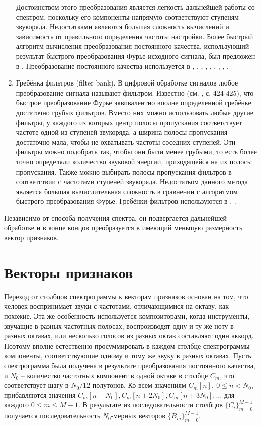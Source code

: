 \begin{enumerate}
  Достоинством этого преобразования является легкость дальнейшей работы со
  спектром, поскольку его компоненты напрямую соответствуют ступеням звукоряда.
  Недостатками являются большая сложность вычислений и зависимость от
  правильного определения частоты настройки. Более быстрый алгоритм вычисления
  преобразования постоянного качества, использующий результат быстрого
  преобразования Фурье исходного сигнала, был предложен в \cite{Brown1992}.
  Преобразование постоянного качества используется в \cite{Bello2005},
  \cite{Lee2006}, \cite{Mauch2008}, \cite{Mauch2009}, \cite{Oudre2009},
  \cite{Reed2009}, \cite{Cho2010}, \cite{Cho2011}, \cite{Ni2011}.
  
  \item Гребёнка фильтров (filter bank). В цифровой обработке сигналов любое
  преобразование сигнала называют фильтром. Известно (см. \cite{Rabiner1978}, с.
  424-425), что быстрое преобразование Фурье эквивалентно вполне определенной
  гребёнке достаточно грубых фильтров. Вместо них можно использовать любые
  другие фильтры, у каждого из которых центр полосы пропускания соответствует
  частоте одной из ступеней звукоряда, а ширина полосы пропускания достаточно
  мала, чтобы не охватывать частоты соседних ступеней. Эти фильтры можно
  подобрать так, чтобы они были менее грубыми, то есть более точно определяли
  количество звуковой энергии, приходящейся на их полосы пропускания. Также
  можно выбирать полосы пропускания фильтров в соответствии с частотами ступеней
  звукоряда. Недостатком данного метода является большая вычислительная
  сложность в сравнении с алгоритмом быстрого преобразования Фурье. Гребёнки
  фильтров используются в \cite{Jiang2011}, \cite{Humphrey2012}.
\end{enumerate}

Независимо от способа получения спектра, он подвергается дальнейшей обработке и
в конце концов преобразуется в имеющий меньшую размерность вектор признаков.

\section{Векторы признаков} \label{sectL_feat}

Переход от столбцов спектрограммы к векторам признаков основан на том, что
человек воспринимает звуки с частотами, отличающимися на октаву, как похожие.
Эта же особенность используется композиторами, когда инструменты, звучащие в
разных частотных полосах, воспроизводят одну и ту же ноту в разных октавах, или
несколько голосов из разных октав составляют один аккорд. Поэтому вполне
естественно просуммировать в каждом столбце спектрограммы компоненты,
соответствующие одному и тому же звуку в разных октавах. Пусть спектрограмма
была получена в результате преобразования постоянного качества, и $N_0$ --
количество частотных компонент в одной октаве в столбце $C_m$, что
соответствует шагу в $N_0/12$ полутонов. Ко всем значениям $C_m[n], ~ 0 \leq n <
N_0$, прибавляются значения $C_m[n+N_0], C_m[n+2N_0], C_m[n+3N_0], \ldots$ для
каждого $0 \leq m \leq M-1$. В результате из последовательности столбцов
$\{C_i\}_{m=0}^{M-1}$ получается последовательность $N_0$-мерных векторов
$\{B_m\}_{m=0}^{M-1}$.


